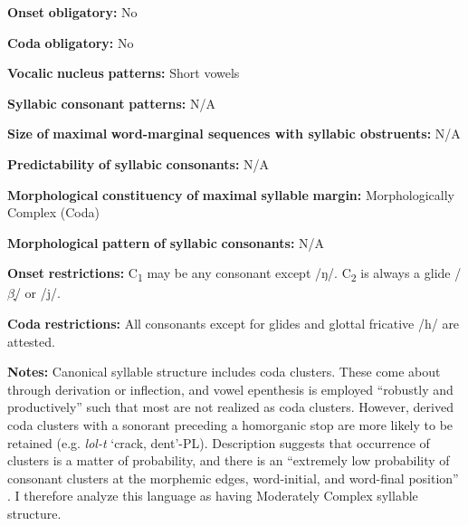 \begin{styleBody}
\textbf{Onset} \textbf{obligatory:} No
\end{styleBody}

\begin{styleBody}
\textbf{Coda} \textbf{obligatory:} No
\end{styleBody}

\begin{styleBody}
\textbf{Vocalic} \textbf{nucleus} \textbf{patterns:} Short vowels
\end{styleBody}

\begin{styleBody}
\textbf{Syllabic} \textbf{consonant} \textbf{patterns:} N/A
\end{styleBody}

\begin{styleBody}
\textbf{Size} \textbf{of} \textbf{maximal} \textbf{word{}-marginal sequences with syllabic obstruents:} N/A
\end{styleBody}

\begin{styleBody}
\textbf{Predictability} \textbf{of} \textbf{syllabic} \textbf{consonants:} N/A
\end{styleBody}

\begin{styleBody}
\textbf{Morphological} \textbf{constituency} \textbf{of} \textbf{maximal} \textbf{syllable} \textbf{margin:} Morphologically Complex (Coda)
\end{styleBody}

\begin{styleBody}
\textbf{Morphological} \textbf{pattern} \textbf{of} \textbf{syllabic} \textbf{consonants:} N/A
\end{styleBody}

\begin{styleBody}
\textbf{Onset} \textbf{restrictions:} C\textsubscript{1} may be any consonant except /ŋ/. C\textsubscript{2} is always a glide /$\beta ̞$/ or /j/.
\end{styleBody}

\begin{styleBody}
\textbf{Coda} \textbf{restrictions:} All consonants except for glides and glottal fricative /h/ are attested. 
\end{styleBody}

\begin{styleBody}
\textbf{Notes:} Canonical syllable structure includes coda clusters. These come about through derivation or inflection, and vowel epenthesis is employed “robustly and productively” such that most are not realized as coda clusters. However, derived coda clusters with a sonorant preceding a homorganic stop are more likely to be retained (e.g. \textit{lol-t} ‘crack, dent’-PL). Description suggests that occurrence of clusters is a matter of probability, and there is an “extremely low probability of consonant clusters at the morphemic edges, word-initial, and word-final position” \citep[55]{Filchenko2007}. I therefore analyze this language as having Moderately Complex syllable structure.
\end{styleBody}

